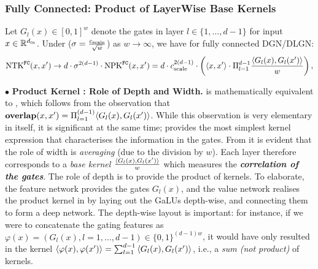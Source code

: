 %
\subsubsection{Fully Connected: Product of LayerWise Base Kernels}
\begin{theorem}
\label{th:fc} Let $G_l(x)\in[0,1]^w$ denote the gates in layer $l\in\{1,\ldots,d-1\}$ for input $x\in\mathbb{R}^{d_{\text{in}}}$. Under   ($\sigma=\frac{c_{\text{scale}}}{\sqrt{w}}$) as $w\rightarrow \infty $, we have for fully connected DGN/DLGN:
\begin{align*}
\text{NTK}^{\texttt{FC}}(x,x') \rightarrow d \cdot \sigma^{2(d-1)} \cdot \text{NPK}^{\texttt{FC}}(x,x') = d \cdot c_{\text{scale}}^{2(d-1)} \cdot \left(\langle  x,x'\rangle \cdot \Pi_{l=1}^{d-1} \frac{\langle G_l(x),G_l(x')\rangle}w\right),
\end{align*}
\end{theorem} 
$\bullet$ \textbf{Product Kernel : Role of Depth and Width.}  is mathematically equivalent to  , which follows from the observation that $\textbf{overlap}(x,x')=\Pi_{l=1}^{(d-1)}\langle G_l(x),G_l(x')\rangle$. While this observation is very elementary in itself, it is significant at the same time;   provides the most simplest kernel expression that characterises the information in the gates. From  it is evident that the role of width is \emph{averaging} (due to the division by $w$). Each layer therefore corresponds to a \emph{base kernel} $\frac{\langle G_l(x),G_l(x')\rangle}w$ which measures the \emph{\textbf{correlation of the gates}}. The role of depth is to provide the product of kernels. To elaborate, the feature network provides the gates $G_l(x)$, and the value network realises the product kernel in  by laying out the GaLUs depth-wise, and connecting them to form a deep network. The depth-wise layout is important: for instance, if we were to concatenate the gating features as $\varphi(x)=(G_l(x),l=1,\ldots,d-1)\in\{0,1\}^{(d-1)w}$, it would have only resulted in the kernel $\langle \varphi(x),\varphi(x')\rangle=\sum_{l=1}^{d-1}{\langle G_l(x),G_l(x')\rangle}$, i.e., a \emph{sum  (not product)} of kernels. 

